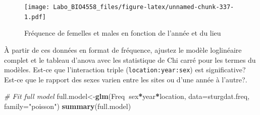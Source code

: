 \documentclass[12pt,]{book}
\makeatletter
\newenvironment{Shaded}{\begin{snugshade}}{\end{snugshade}}
\newcommand{\CommentTok}[1]{\textcolor[rgb]{0.56,0.35,0.01}{\textit{#1}}}
\newcommand{\DataTypeTok}[1]{\textcolor[rgb]{0.13,0.29,0.53}{#1}}
\newcommand{\KeywordTok}[1]{\textcolor[rgb]{0.13,0.29,0.53}{\textbf{#1}}}
\newcommand{\NormalTok}[1]{#1}
\newcommand{\OperatorTok}[1]{\textcolor[rgb]{0.81,0.36,0.00}{\textbf{#1}}}
\newcommand{\StringTok}[1]{\textcolor[rgb]{0.31,0.60,0.02}{#1}}
\newenvironment{kframe}{%
\medskip{}
\setlength{\fboxsep}{.8em}
\def\at@end@of@kframe{}%
\ifinner\ifhmode%
 \def\at@end@of@kframe{\end{minipage}}%
 \begin{minipage}{\columnwidth}%
\fi\fi%
\def\FrameCommand##1{\hskip\@totalleftmargin \hskip-\fboxsep
\colorbox{incolor}{##1}\hskip-\fboxsep
    \hskip-\linewidth \hskip-\@totalleftmargin \hskip\columnwidth}%
\MakeFramed {\advance\hsize-\width
  \@totalleftmargin\z@ \linewidth\hsize
  \@setminipage}}%
{\par\unskip\endMakeFramed%
\at@end@of@kframe}
\newenvironment{rmdblock}[1]
 {
 \begin{itemize}
 \renewcommand{\labelitemi}{
   \raisebox{-.7\height}[0pt][0pt]{
     {\setkeys{Gin}{width=3em,keepaspectratio}\texttt{[image: images/\#1]}}
   }
 }
 \begin{kframe}
 \setlength{\fboxsep}{1em}
 \item
 }
 {
 \end{kframe}
 \end{itemize}
 }
\newenvironment{rmdcode}
  {\begin{rmdblock}{screen}}
  {\end{rmdblock}}
\makeatother
\begin{document}
\begin{figure}
\centering
\texttt{[image: Labo\_BIO4558\_files/figure-latex/unnamed-chunk-337-1.pdf]}
\caption{\label{fig:unnamed-chunk-337}Fréquence de femelles et males en fonction de l'année et du lieu}
\end{figure}

\begin{rmdcode}
À partir de ces données en format de fréquence, ajustez le modèle loglinéaire complet et le tableau d'anova avec les statistique de Chi carré pour les termes du modèles. Est-ce que l'interaction triple (\texttt{location:year:sex}) est significative? Est-ce que le rapport des sexes varien entre les sites ou d'une année à l'autre?.
\end{rmdcode}

\begin{Shaded}
\begin{Highlighting}[]
\CommentTok{# Fit full model}
\NormalTok{full.model<-}\KeywordTok{glm}\NormalTok{(Freq}\OperatorTok{~}\NormalTok{sex}\OperatorTok{*}\NormalTok{year}\OperatorTok{*}\NormalTok{location, }\DataTypeTok{data=}\NormalTok{sturgdat.freq, }\DataTypeTok{family=}\StringTok{"poisson"}\NormalTok{)}
\KeywordTok{summary}\NormalTok{(full.model)}
\end{Highlighting}
\end{Shaded}
\end{document}
